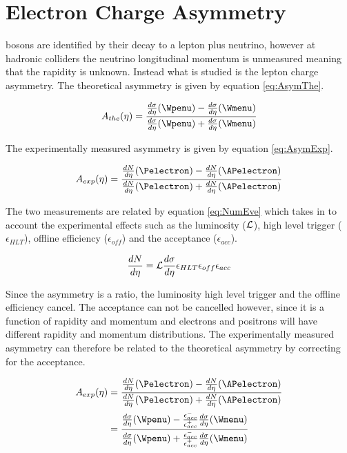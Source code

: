 \section{Electron Charge Asymmetry}

\PW bosons are identified by their decay to a lepton plus neutrino, however at
hadronic colliders the neutrino longitudinal momentum is unmeasured meaning
that the \PW rapidity is unknown. Instead what is studied is the lepton charge
asymmetry.\cite{phenom} The theoretical asymmetry is given by equation
\ref{eq:AsymThe}.

\begin{equation}
A_{the}(\eta)=\frac{  \frac{d\sigma}{d\eta}(\Wpenu) -
\frac{d\sigma}{d\eta}(\Wmenu) }{ \frac{d\sigma}{d\eta}(\Wpenu) +
\frac{d\sigma}{d\eta}(\Wmenu) }
\label{eq:AsymThe}
\end{equation} 

The experimentally measured asymmetry is given by equation
\ref{eq:AsymExp}.\cite{kom}
 
\begin{equation}
A_{exp}(\eta)=\frac{  \frac{dN}{d\eta}(\Pelectron) -
\frac{dN}{d\eta}(\APelectron) }{ \frac{dN}{d\eta}(\Pelectron) +
\frac{dN}{d\eta}(\APelectron) }
\label{eq:AsymExp}
\end{equation} 

The two measurements are related by equation \ref{eq:NumEve} which takes in to
account the experimental effects such as the luminosity (${\cal L}$), high
level trigger ($\epsilon_{HLT}$), offline efficiency ($ \epsilon_{off}$) and
the acceptance ($\epsilon_{acc}$).

\begin{equation}
\frac{dN}{d\eta} = {\cal L } \frac{d\sigma}{d\eta}  \epsilon_{HLT}
\epsilon_{off} \epsilon_{acc}
\label{eq:NumEve}
\end{equation} 

Since the asymmetry is a ratio, the luminosity high level trigger and the
offline efficiency cancel.\cite{me} The acceptance can not be cancelled
however, since it is a function of rapidity and momentum and electrons and
positrons will have different rapidity and momentum distributions. The
experimentally measured asymmetry can therefore be related to the theoretical
asymmetry by correcting for the acceptance.\cite{me}

\begin{align} 
A_{exp}(\eta) &= \frac{ \frac{dN}{d\eta}(\Pelectron) -
\frac{dN}{d\eta}(\APelectron) }{ \frac{dN}{d\eta}(\Pelectron) +
\frac{dN}{d\eta}(\APelectron) }\\   
              &= \frac{ \frac{d\sigma}{d\eta}(\Wpenu) -
\frac{\epsilon^{-}_{acc}}{\epsilon^{+}_{acc}} \frac{d\sigma}{d\eta}(\Wmenu) }{
\frac{d\sigma}{d\eta}(\Wpenu) + \frac{\epsilon^{-}_{acc}}{\epsilon^{+}_{acc}}
\frac{d\sigma}{d\eta}(\Wmenu) }
\label{eq:AsymExpCorr}
\end{align}

